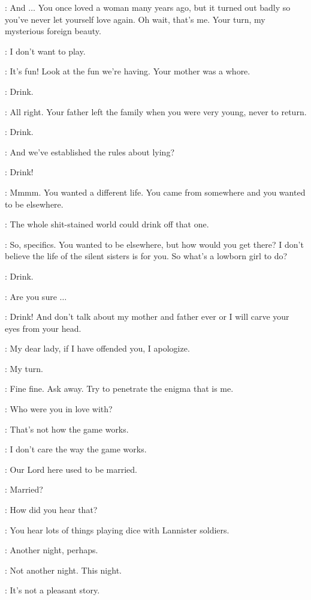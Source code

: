 \TYRION: And $\ldots$ You once loved a woman many years ago, but it turned out badly so you've never let yourself love again. Oh wait, that's me. Your turn, my mysterious foreign beauty. 

\SHAE: I don't want to play. 

\TYRION: It's fun! Look at the fun we're having. Your mother was a whore. 

\SHAE: Drink. 

\TYRION: All right. Your father left the family when you were very young, never to return. 

\SHAE: Drink. 

\TYRION: And we've established the rules about lying? 

\SHAE: Drink! 

\TYRION: Mmmm. You wanted a different life. You came from somewhere and you wanted to be elsewhere. 

\BRONN: The whole shit-stained world could drink off that one. 

\TYRION: So, specifics. You wanted to be elsewhere, but how would you get there? I don't believe the life of the silent sisters is for you. So what's a lowborn girl to do? 

\SHAE: Drink. 

\TYRION: Are you sure $\ldots$ 

\SHAE: Drink! And don't talk about my mother and father ever or I will carve your eyes from your head. 

\TYRION: My dear lady, if I have offended you, I apologize. 

\SHAE: My turn. 

\TYRION: Fine fine. Ask away. Try to penetrate the enigma that is me. 

\SHAE: Who were you in love with? 

\TYRION: That's not how the game works. 

\SHAE: I don't care the way the game works. 

\BRONN: Our Lord here used to be married. 

\SHAE: Married? 

\TYRION: How did you hear that? 

\BRONN: You hear lots of things playing dice with Lannister soldiers. 

\TYRION: Another night, perhaps. 

\SHAE: Not another night. This night. 

\TYRION: It's not a pleasant story. 

